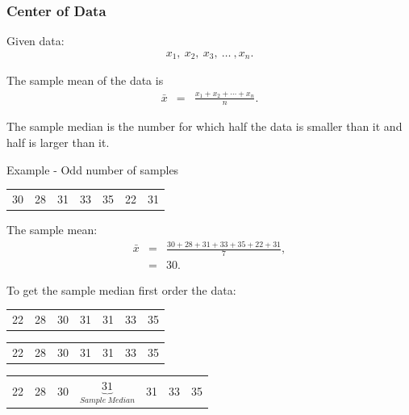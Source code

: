 \begin{frame}
  \frametitle{Center of Data}

  Given data:
  \begin{eqnarray*}
    x_1, ~ x_2, ~ x_3, ~ \ldots ~,x_n.
  \end{eqnarray*}

  \begin{definition}
    The sample mean of the data is 
    \begin{eqnarray*}
      \bar{x} & = & \frac{x_1+x_2+\cdots+x_n}{n}.
    \end{eqnarray*}
  \end{definition}

  \begin{definition}
    The sample median is the number for which half the data is smaller
    than it and half is larger than it.
  \end{definition}
  

\end{frame}


\begin{frame}{Example - Odd number of samples}

  \begin{tabular}{lllllll}
    30 & 28 & 31 & 33 & 35 & 22 & 31
  \end{tabular}

  The sample mean:
  \begin{eqnarray*}
    \bar{x} & = & \frac{30 + 28 + 31 + 33 + 35 + 22 + 31}{7}, \\
    & = & 30.
  \end{eqnarray*}

  To get the sample median first order the data: \\
  {
    \begin{tabular}{lllllll}
      22 & 28 & 30 & 31 & 31 & 33 & 35
    \end{tabular}
  }

  {
    \begin{tabular}{lllllll}
      {\color{red}22} & {\color{red}28} & {\color{red}30} & 31 & {\color{blue}31} & {\color{blue}33} & {\color{blue}35}
    \end{tabular}
  }

  {
    \begin{tabular}{lllllll}
      {\color{red}22} & {\color{red}28} & {\color{red}30} &
      $\underbrace{31}_{Sample~Median}$ & {\color{blue}31} & {\color{blue}33} & {\color{blue}35}
    \end{tabular}
  }
  
\end{frame}


